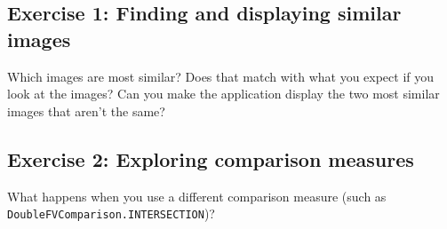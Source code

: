 \subsection*{Exercise 1: Finding and displaying similar images}
Which images are most similar?  Does that match with what you expect if you look at the 
images?  Can you make the application display the two most similar images that aren't the same?

\subsection*{Exercise 2: Exploring comparison measures}
\raggedright
What happens when you use a different comparison measure (such as 
\verb+DoubleFVComparison.INTERSECTION+)?

